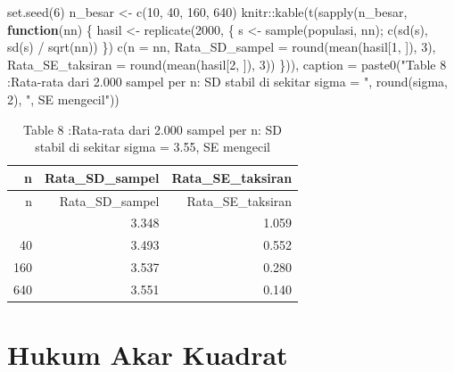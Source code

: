 \documentclass[
  indonesian,
  letterpaper,
]{book}
\newenvironment{Shaded}{\begin{snugshade}}{\end{snugshade}}
\newcommand{\AttributeTok}[1]{\textcolor[rgb]{0.40,0.45,0.13}{#1}}
\newcommand{\ControlFlowTok}[1]{\textcolor[rgb]{0.00,0.23,0.31}{\textbf{#1}}}
\newcommand{\DecValTok}[1]{\textcolor[rgb]{0.68,0.00,0.00}{#1}}
\newcommand{\FunctionTok}[1]{\textcolor[rgb]{0.28,0.35,0.67}{#1}}
\newcommand{\NormalTok}[1]{\textcolor[rgb]{0.00,0.23,0.31}{#1}}
\newcommand{\OtherTok}[1]{\textcolor[rgb]{0.00,0.23,0.31}{#1}}
\newcommand{\SpecialCharTok}[1]{\textcolor[rgb]{0.37,0.37,0.37}{#1}}
\newcommand{\StringTok}[1]{\textcolor[rgb]{0.13,0.47,0.30}{#1}}
\begin{document}
\begin{Shaded}
\begin{Highlighting}[]
\FunctionTok{set.seed}\NormalTok{(}\DecValTok{6}\NormalTok{)}
\NormalTok{n\_besar }\OtherTok{\textless{}{-}} \FunctionTok{c}\NormalTok{(}\DecValTok{10}\NormalTok{, }\DecValTok{40}\NormalTok{, }\DecValTok{160}\NormalTok{, }\DecValTok{640}\NormalTok{)}
\NormalTok{knitr}\SpecialCharTok{::}\FunctionTok{kable}\NormalTok{(}\FunctionTok{t}\NormalTok{(}\FunctionTok{sapply}\NormalTok{(n\_besar, }\ControlFlowTok{function}\NormalTok{(nn) \{}
\NormalTok{hasil }\OtherTok{\textless{}{-}} \FunctionTok{replicate}\NormalTok{(}\DecValTok{2000}\NormalTok{, \{ s }\OtherTok{\textless{}{-}} \FunctionTok{sample}\NormalTok{(populasi, nn); }\FunctionTok{c}\NormalTok{(}\FunctionTok{sd}\NormalTok{(s), }\FunctionTok{sd}\NormalTok{(s) }\SpecialCharTok{/} \FunctionTok{sqrt}\NormalTok{(nn)) \})}
\FunctionTok{c}\NormalTok{(}\AttributeTok{n =}\NormalTok{ nn, }\AttributeTok{Rata\_SD\_sampel =} \FunctionTok{round}\NormalTok{(}\FunctionTok{mean}\NormalTok{(hasil[}\DecValTok{1}\NormalTok{, ]), }\DecValTok{3}\NormalTok{),}
\AttributeTok{Rata\_SE\_taksiran =} \FunctionTok{round}\NormalTok{(}\FunctionTok{mean}\NormalTok{(hasil[}\DecValTok{2}\NormalTok{, ]), }\DecValTok{3}\NormalTok{))}
\NormalTok{\})), }\AttributeTok{caption =} \FunctionTok{paste0}\NormalTok{(}\StringTok{"Table 8 :Rata{-}rata dari 2.000 sampel per n: SD stabil di sekitar sigma = "}\NormalTok{,}
\FunctionTok{round}\NormalTok{(sigma, }\DecValTok{2}\NormalTok{), }\StringTok{", SE mengecil"}\NormalTok{))}
\end{Highlighting}
\end{Shaded}

\begin{longtable}[]{@{}rrr@{}}
\caption{Table 8 :Rata-rata dari 2.000 sampel per n: SD stabil di
sekitar sigma = 3.55, SE mengecil}\tabularnewline
\toprule\noalign{}
n & Rata\_SD\_sampel & Rata\_SE\_taksiran \\
\midrule\noalign{}
\endfirsthead
\toprule\noalign{}
n & Rata\_SD\_sampel & Rata\_SE\_taksiran \\
\midrule\noalign{}
\endhead
\bottomrule\noalign{}
\endlastfoot
10 & 3.348 & 1.059 \\
40 & 3.493 & 0.552 \\
160 & 3.537 & 0.280 \\
640 & 3.551 & 0.140 \\
\end{longtable}

\section{Hukum Akar Kuadrat}\label{hukum-akar-kuadrat}
\end{document}
